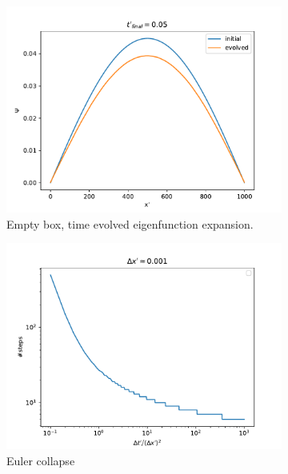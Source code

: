 \documentclass{article}
\begin{document}
\begin{figure}[H]
    \begin{subfigure}[b]{0.5\textwidth}
        \includegraphics[width=\linewidth]{./media/time_evolve_emptybox_1.pdf}
        \caption{Empty box, time evolved eigenfunction expansion.}
        \label{fig:box-time-evolved1}
    \end{subfigure}
    \begin{subfigure}[b]{0.5\textwidth}
        \includegraphics[width=\linewidth]{./media/steps_before_euler_collapse.pdf}
        \caption{Euler collapse}
        \label{fig:euler-collapse}
    \end{subfigure}
    \begin{subfigure}[b]{0.5\textwidth}

\end{subfigure}
\end{figure}
\end{document}
